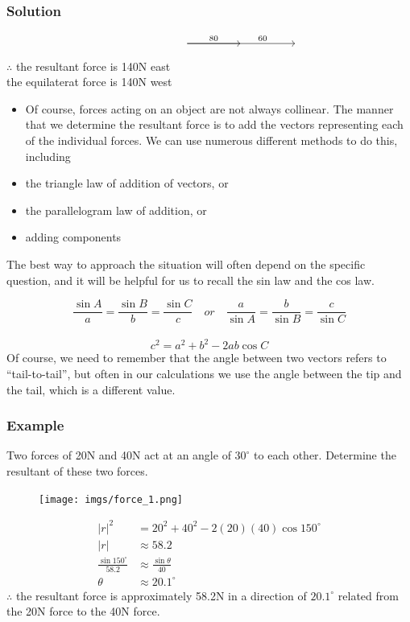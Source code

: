 \documentclass{article}
\begin{document}
\subsubsection*{Solution}
\[\begin{tikzcd}
	{} && {} &&&& {}
	\arrow[""{name=0, anchor=center, inner sep=0}, "60"{pos=0.7}, from=1-3, to=1-7]
	\arrow["80", from=1-3, to=0]
\end{tikzcd}\]
$\therefore$ the resultant force is 140N east\\
the equilaterat force is 140N west

\begin{itemize}
    \item Of course, forces acting on an object are not always collinear.  The manner that we determine the resultant force is to add the vectors representing each of the individual forces.  We can use numerous different methods to do this, including
    \item the triangle law of addition of vectors, or
    \item the parallelogram law of addition, or
    \item adding components
\end{itemize}
 The best way to approach the situation will often depend on the specific question, and it will be helpful for us to recall the sin law and the cos law.
 
 $$\frac{\sin A}{a}=\frac{\sin B}{b}=\frac{\sin C}{c} \quad or \quad \frac{a}{\sin A}=\frac{b}{\sin B}=\frac{c}{\sin C}$$\\

 $$c^2=a^2+b^2-2ab\cos C$$
 Of course, we need to remember that the angle between two vectors refers to “tail-to-tail”, but often in our calculations we use the angle between the tip and the tail, which is a different value.
 \subsubsection*{Example}
Two forces of 20N and 40N act at an angle of $30^{\circ}$ to each other.  Determine the resultant of these two forces.
\begin{figure}[h]
    \centering
    \texttt{[image: imgs/force\_1.png]}
\end{figure}
\begin{align*}
    |r|^2&=20^2+40^2-2(20)(40)\cos 150 ^{\circ}\\
    |r|&\approx 58.2\\
    \frac{\sin 150^{\circ}}{58.2}&\approx \frac{\sin \theta}{40}\\
    \theta &\approx 20.1^{\circ}
\end{align*}
$\therefore$ the resultant force is approximately 58.2N in a direction of $20.1^{\circ}$ related from the 20N force to the 40N force.\\
\newpage 
\end{document}

